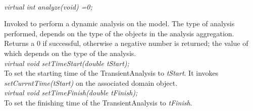 \\
{\em virtual int analyze(void) =0;} 

Invoked to perform a dynamic analysis on the model. The type of analysis
performed, depends on the type of the objects in the analysis
aggregation. Returns a $0$ if successful, otherwise a negative number
is returned; the value of which depends on the type of the analysis. \\

{\em virtual void setTimeStart(double tStart);}\\
To set the starting time of the TransientAnalysis to {\em tStart}. It
invokes {\em setCurrntTime(tStart)} on the associated domain object.\\

{\em virtual void setTimeFinish(double tFinish);}\\
To set the finishing time of the TransientAnalysis to {\em tFinish}. \\

\\
